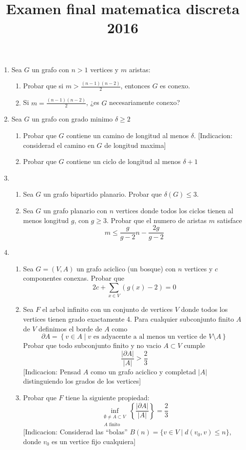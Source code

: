 \documentclass{article}
\begin{document}
\title{Examen final matematica discreta 2016}
\date {}
\maketitle

\begin{enumerate}
\item Sea $G$ un grafo con $n > 1$ vertices y $m$ aristas:
\begin{enumerate}
\item Probar que si $m > \frac{(n-1)(n-2)}{2}$, entonces $G$ es conexo.
\item Si $m = \frac{(n-1)(n-2)}{2}$, ¿es $G$ necesariamente conexo?
\end{enumerate}
\item Sea $G$ un grafo con grado minimo $\delta \geq 2$
\begin{enumerate}
\item Probar que $G$ contiene un camino de longitud al menos $\delta$. [Indicacion: considerad
el camino en $G$ de longitud maxima]
\item Probar que $G$ contiene un ciclo de longitud al menos $\delta + 1$
\end{enumerate}
\item \begin{enumerate}
\item Sea $G$ un grafo bipartido planario. Probar que $\delta(G) \leq 3$.
\item Sea $G$ un grafo planario con $n$ vertices donde todos los ciclos tienen al menos
longitud $g$, con $g \geq 3$. Probar que el numero de aristas $m$ satisface
\[
m \leq \frac{g}{g-2}n - \frac{2g}{g-2}
\]
\end{enumerate}
\item \begin{enumerate}
\item Sea $G = (V, A)$ un grafo aciclico (un bosque) con $n$ vertices y $c$ componentes conexas.
Probar que
\[
2c + \sum_{x \in V}(g(x) - 2) = 0
\]
\item Sea $F$ el arbol infinito con un conjunto de vertices $V$ donde todos los vertices tienen grado
exactamente 4. Para cualquier subconjunto finito $A$ de $V$ definimos el borde de $A$ como
\[
\partial A = \left\{ v \in A \mid v \text{ es adyacente a al menos un vertice de } V\setminus A \right\}
\]
Probar que todo subconjunto finito y no vacio $A \subset V$ cumple
\[
\frac{\lvert \partial A \rvert}{\lvert A \rvert} > \frac{2}{3}
\]
[Indicacion: Pensad $A$ como un grafo aciclico y completad $\lvert A \rvert$ distinguiendo los grados
de los vertices]
\item Probar que $F$ tiene la siguiente propiedad:
\[
\inf_{\substack{\emptyset \neq A \subset V \\ A \text{ finito}}}
\left\{ \frac{\lvert \partial A \rvert}{\lvert A \rvert} \right\} = \frac{2}{3}
\]
[Indicacion: Considerad las ``bolas'' $B(n) = \{v \in V \mid d(v_0,v) \leq n\}$, donde $v_0$ es un
vertice fijo cualquiera]
\end{enumerate}
\end{enumerate}
\end{document}
